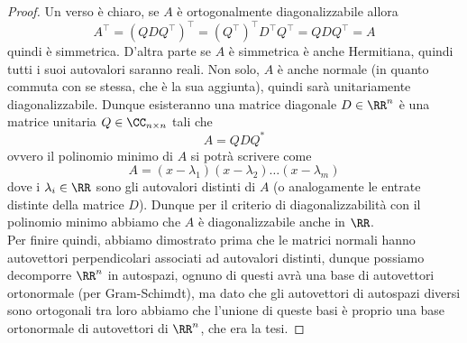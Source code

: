 \documentclass[11pt]{scrartcl}
\begin{document}
   	 \begin{proof}
   	 	Un verso è chiaro, se $A$ è ortogonalmente diagonalizzabile allora
   	 	$$A^\intercal=\left(QDQ^\intercal\right)^\intercal=\left(Q^\intercal\right)^\intercal D^\intercal Q^\intercal=QDQ^\intercal=A$$
   	 	quindi è simmetrica. D'altra parte se $A$ è simmetrica è anche Hermitiana, quindi tutti i suoi autovalori saranno reali. Non solo, $A$ è anche normale (in quanto commuta con se stessa, che è la sua aggiunta), quindi sarà unitariamente diagonalizzabile. Dunque esisteranno una matrice diagonale $D\in \RR^n$ è una matrice unitaria $Q\in \CC_{n\times n}$ tali che
   	 	$$A=QDQ^*$$
   	 	ovvero il polinomio minimo di $A$ si potrà scrivere come
   	 	$$A=\left(x-\lambda_1\right)\left(x-\lambda_2\right)\dots\left(x-\lambda_m\right)$$
   	 	dove i $\lambda_i\in \RR$ sono gli autovalori distinti di $A$ (o analogamente le entrate distinte della matrice $D$). Dunque per il criterio di diagonalizzabilità con il polinomio minimo abbiamo che $A$ è diagonalizzabile anche in $\RR$. \\
   	 	Per finire quindi, abbiamo dimostrato prima che le matrici normali hanno autovettori perpendicolari associati ad autovalori distinti, dunque possiamo decomporre $\RR^n$ in autospazi, ognuno di questi avrà una base di autovettori ortonormale (per Gram-Schimdt), ma dato che gli autovettori di autospazi diversi sono ortogonali tra loro abbiamo che l'unione di queste basi è proprio una base ortonormale di autovettori di $\RR^n$, che era la tesi.
   	 \end{proof}
   	 
\end{document}
